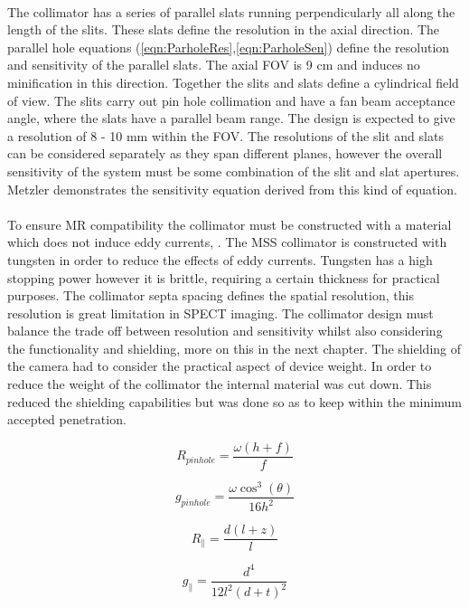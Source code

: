 \paragraph{}
The collimator has a series of parallel slats running perpendicularly all along the length of the slits. These slats define the resolution in the axial direction. The parallel hole equations (\ref{eqn:ParholeRes},\ref{eqn:ParholeSen}) define the resolution and sensitivity of the parallel slats. The axial FOV is 9 cm and induces no minification in this direction. Together the slits and slats define a cylindrical field of view. The slits carry out pin hole collimation and have a fan beam acceptance angle, where the slats have a parallel beam range. The design is expected to give a resolution of 8 - 10 mm within the FOV. The resolutions of the slit and slats can be considered separately  as they span different planes, however the overall sensitivity of the system must be some combination of the slit and slat apertures. Metzler \cite{Metzler2010SlitSlatAM} demonstrates the sensitivity equation derived from this kind of equation.
\paragraph{} 
To ensure MR compatibility the collimator must be constructed with a material which does not induce eddy currents, \cite{7286864}. The MSS collimator is constructed with tungsten in order to reduce the effects of eddy currents. Tungsten has a high stopping power however it is brittle, requiring a certain thickness for practical purposes. The collimator septa spacing defines the spatial resolution, this resolution is great limitation in SPECT imaging. The collimator design must balance the trade off between resolution and sensitivity whilst also considering the functionality and shielding, more on this in the next chapter. The shielding of the camera had to consider the practical aspect of device weight. In order to reduce the weight of the collimator the internal material was cut down. This reduced the shielding capabilities but was done so as to keep within the minimum accepted penetration. 


\begin{equation} \label{eqn:pinholeRes}
        R_{pinhole} = \frac{\omega(h + f)}{f}
\end{equation}


\begin{equation} \label{eqn:pinholeSen}
        g_{pinhole} = \frac{\omega \cos^{3}(\theta)}{16h^{2}}
\end{equation}

\begin{equation} \label{eqn:ParholeRes}
        R_{\parallel} = \frac{d(l + z)}{l}
\end{equation}


\begin{equation} \label{eqn:ParholeSen}
        g_{\parallel} = \frac{d^{4}}{12l^{2}(d+t)^{2}}
\end{equation}
